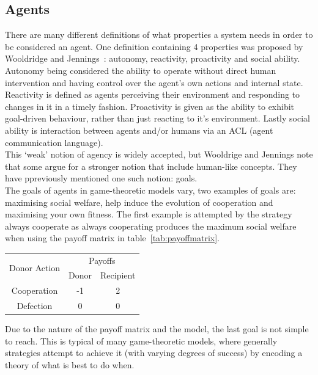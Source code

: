 \documentclass[twoside,twocolumn]{article}
\begin{document}
\subsection{Agents}
There are many different definitions of what properties a system needs in order to be considered an agent. One definition containing 4 properties was proposed by Wooldridge and Jennings~\cite{wooldridge_jennings_1995}: autonomy, reactivity, proactivity and social ability.\\
Autonomy being considered the ability to operate without direct human intervention and having control over the agent's own actions and internal state. Reactivity is defined as agents perceiving their environment and responding to changes in it in a timely fashion. Proactivity is given as the ability to exhibit goal-driven behaviour, rather than just reacting to it's environment. Lastly social ability is interaction between agents and/or humans via an ACL (agent communication language).\\
This `weak' notion of agency is widely accepted, but Wooldrige and Jennings note that some argue for a stronger notion that include human-like concepts. They have ppreviously mentioned one such notion: goals.\\
The goals of agents in game-theoretic models vary, two examples of goals are: maximising social welfare, help induce the evolution of cooperation and maximising your own fitness. The first example is attempted by the strategy always cooperate as always cooperating produces the maximum social welfare when using the payoff matrix in table~\ref{tab:payoffmatrix}.\\
\begin{framed}
	\begin{center}
		\begin{tabular}{c|c|c}
		\multirow{2}{*}{Donor Action} & \multicolumn{2}{c}{Payoffs}\\		
		& Donor & Recipient\\
		\hline
		Cooperation & -1 & 2\\
		\hline
		Defection & 0 & 0\\
		\end{tabular}
		\label{tab:payoffmatrix}
	\end{center}	
\end{framed}
\noindent Due to the nature of the payoff matrix and the model, the last goal is not simple to reach. This is typical of many game-theoretic models, where generally strategies attempt to achieve it (with varying degrees of success) by encoding a theory of what is best to do when.\\
\end{document}
